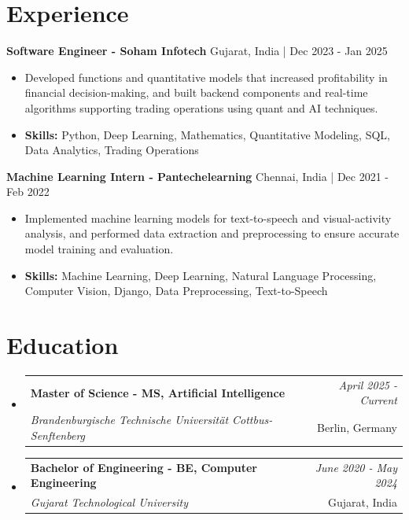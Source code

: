 \documentclass[a4paper,11pt]{article}
\makeatletter
\newcommand{\resumeSubheading}[4]{
\vspace{0.5mm}\item
    \begin{tabular*}{\linewidth}[t]{l@{\extracolsep{\fill}}r}
        \textbf{#1} & \textit{\footnotesize{#4}} \\
        \textit{\footnotesize{#3}} &  \footnotesize{#2}\\
    \end{tabular*}
    \vspace{-2.4mm}
}
\makeatother
\begin{document}
\section{\textbf{Experience}}


\vspace{1mm}
  \textbf{Software Engineer - Soham Infotech} \hfill Gujarat, India | Dec 2023 - Jan 2025
\vspace{-1.5mm} %
\begin{itemize}
  \item Developed functions and quantitative models that increased profitability in financial decision-making, and built backend components and real-time algorithms supporting trading operations using quant and AI techniques.

\vspace{-2mm}
  \item \textbf{Skills:} Python, Deep Learning, Mathematics, Quantitative Modeling, SQL, Data Analytics, Trading Operations
\end{itemize}

\vspace{1mm}
  \textbf{Machine Learning Intern - Pantechelearning} \hfill Chennai, India | Dec 2021 - Feb 2022
\vspace{-1.5mm} %
\begin{itemize}
  \item Implemented machine learning models for text-to-speech and visual-activity analysis, and performed data extraction and preprocessing to ensure accurate model training and evaluation.
\vspace{-2mm}
  \item \textbf{Skills:} Machine Learning, Deep Learning, Natural Language Processing, Computer Vision, Django, Data Preprocessing, Text-to-Speech
\end{itemize}\section{\textbf{Education}}
\vspace{-0.4mm}

\begin{itemize}[leftmargin=0.15in, label={}]
\resumeSubheading
{Master of Science - MS, Artificial Intelligence }{Berlin, Germany}
{Brandenburgische Technische Universität Cottbus-Senftenberg  }{April 2025 - Current}

\vspace{1.0mm} %
\resumeSubheading
{Bachelor of Engineering - BE, Computer Engineering  }{Gujarat, India}
{Gujarat Technological University }{June 2020 - May 2024}

\end{itemize}
\end{document}
